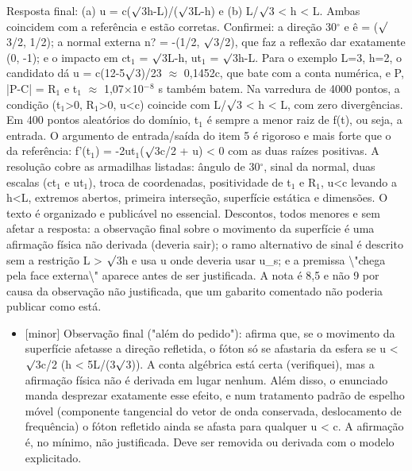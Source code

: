 \documentclass{article}%
\begin{document}
Resposta final: (a) u = c($\surd$3h-L)/($\surd$3L-h) e (b) L/$\surd$3 < h < L. Ambas coincidem com a referência e estão corretas. Confirmei: a direção 30$^\circ$ e ê = ($\surd$3/2, 1/2); a normal externa n? = -(1/2, $\surd$3/2), que faz a reflexão dar exatamente (0, -1); e o impacto em ct$_{1}$ = $\surd$3L-h, ut$_{1}$ = $\surd$3h-L. Para o exemplo L=3, h=2, o candidato dá u = c(12-5$\surd$3)/23 $\approx$ 0,1452c, que bate com a conta numérica, e P, |P-C| = R$_{1}$ e t$_{1}$ $\approx$ 1,07$\times$10$^{-}$$^{8}$ s também batem. Na varredura de 4000 pontos, a condição (t$_{1}$>0, R$_{1}$>0, u<c) coincide com L/$\surd$3 < h < L, com zero divergências. Em 400 pontos aleatórios do domínio, t$_{1}$ é sempre a menor raiz de f(t), ou seja, a entrada.\newline%
\newline%
O argumento de entrada/saída do item 5 é rigoroso e mais forte que o da referência: f'(t$_{1}$) = -2ut$_{1}$($\surd$3c/2 + u) < 0 com as duas raízes positivas. A resolução cobre as armadilhas listadas: ângulo de 30$^\circ$, sinal da normal, duas escalas (ct$_{1}$ e ut$_{1}$), troca de coordenadas, positividade de t$_{1}$ e R$_{1}$, u<c levando a h<L, extremos abertos, primeira interseção, superfície estática e dimensões. O texto é organizado e publicável no essencial.\newline%
\newline%
Descontos, todos menores e sem afetar a resposta: a observação final sobre o movimento da superfície é uma afirmação física não derivada (deveria sair); o ramo alternativo de sinal é descrito sem a restrição L > $\surd$3h e usa u onde deveria usar u\_s; e a premissa \textbackslash{}"chega pela face externa\textbackslash{}" aparece antes de ser justificada. A nota é 8,5 e não 9 por causa da observação não justificada, que um gabarito comentado não poderia publicar como está.%
\begin{itemize}%
\item%
{[}minor{]} Observação final ("além do pedido"): afirma que, se o movimento da superfície afetasse a direção refletida, o fóton só se afastaria da esfera se u < $\surd$3c/2 (h < 5L/(3$\surd$3)). A conta algébrica está certa (verifiquei), mas a afirmação física não é derivada em lugar nenhum. Além disso, o enunciado manda desprezar exatamente esse efeito, e num tratamento padrão de espelho móvel (componente tangencial do vetor de onda conservada, deslocamento de frequência) o fóton refletido ainda se afasta para qualquer u < c. A afirmação é, no mínimo, não justificada. Deve ser removida ou derivada com o modelo explicitado.%

\end{itemize}$$
\end{document}
